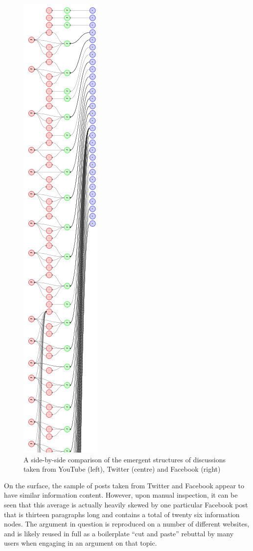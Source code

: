 \begin{figure}
\begin{minipage}[b]{.30\textwidth}
  \includegraphics[scale=0.5]{./figures/speechacts/facebook.png}  
\end{minipage}

\caption{A side-by-side comparison of the emergent structures of discussions taken from YouTube (left), Twitter (centre) and Facebook (right)}
\label{figure:speechacts}
\end{figure}

On the surface, the sample of posts taken from Twitter and Facebook appear to have similar information content. However, upon manual inspection, it can be seen that this average is actually heavily skewed by one particular Facebook post that is thirteen paragraphs long and contains a total of twenty six information nodes. The argument in question is reproduced on a number of different websites, and is likely reused in full as a boilerplate ``cut and paste'' rebuttal by many users when engaging in an argument on that topic.

